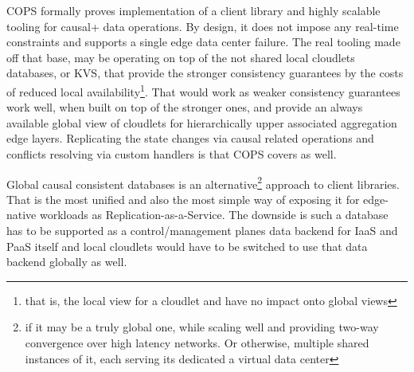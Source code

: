 \documentclass[conference]{IEEEtran}
\begin{document}
COPS formally proves implementation of a client library and highly scalable
tooling for causal+ data operations. By design, it does not impose any
real-time constraints and supports a single edge data center failure. The real
tooling made off that base, may be operating on top of the not shared local
cloudlets databases, or KVS, that provide the stronger consistency guarantees
by the costs of reduced local availability\footnote{that is, the local view for
a cloudlet and have no impact onto global views}. That would work as weaker
consistency guarantees work well, when built on top of the stronger ones, and
provide an always available global view of cloudlets for hierarchically
upper associated aggregation edge layers. Replicating the state changes via
causal related operations and conflicts resolving via custom handlers is that
COPS covers as well.

Global causal consistent databases\cite{b6} is an alternative\footnote{if it
may be a truly global one, while scaling well and providing two-way convergence
over high latency networks. Or otherwise, multiple shared instances of it, each
serving its dedicated a virtual data center} approach to client libraries. That
is the most unified and also the most simple way of exposing it for edge-native
workloads as Replication-as-a-Service. The downside is such a database has to
be supported as a control/management planes data backend for IaaS and PaaS
itself and local cloudlets would have to be switched to use that data backend
globally as well.
\end{document}
